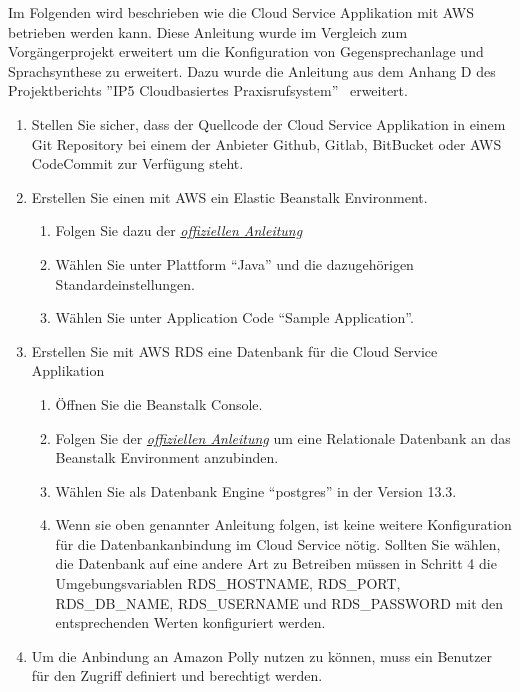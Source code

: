 Im Folgenden wird beschrieben wie die Cloud Service Applikation mit AWS betrieben werden kann.
Diese Anleitung wurde im Vergleich zum Vorgängerprojekt erweitert um die Konfiguration von Gegensprechanlage und Sprachsynthese zu erweitert.
Dazu wurde die Anleitung aus dem Anhang D des Projektberichts ''IP5 Cloudbasiertes Praxisrufsystem''~\cite{ip5} erweitert.

\begin{enumerate}
    \item Stellen Sie sicher, dass der Quellcode der Cloud Service Applikation in einem Git Repository bei einem der Anbieter Github, Gitlab, BitBucket oder AWS CodeCommit zur Verfügung steht.
    \item Erstellen Sie einen mit AWS ein Elastic Beanstalk Environment.
    \begin{enumerate}
        \item Folgen Sie dazu der \href{https://docs.aws.amazon.com/elasticbeanstalk/latest/dg/GettingStarted.CreateApp.html}{\textit{offiziellen Anleitung}}\cite{aws-elastic}
        \item Wählen Sie unter Plattform ``Java'' und die dazugehörigen Standardeinstellungen.
        \item Wählen Sie unter Application Code ``Sample Application''.
    \end{enumerate}
    \item Erstellen Sie mit AWS RDS eine Datenbank für die Cloud Service Applikation
    \begin{enumerate}
        \item Öffnen Sie die Beanstalk Console.
        \item Folgen Sie der \href{https://docs.aws.amazon.com/elasticbeanstalk/latest/dg/using-features.managing.db.html}{\textit{offiziellen Anleitung}}\cite{aws-elastic-rds} um eine Relationale Datenbank an das Beanstalk Environment anzubinden.
        \item Wählen Sie als Datenbank Engine ``postgres'' in der Version 13.3.
        \item Wenn sie oben genannter Anleitung folgen, ist keine weitere Konfiguration für die Datenbankanbindung im Cloud Service nötig.
        Sollten Sie wählen, die Datenbank auf eine andere Art zu Betreiben müssen in Schritt 4 die Umgebungsvariablen RDS\_HOSTNAME, RDS\_PORT, RDS\_DB\_NAME, RDS\_USERNAME und RDS\_PASSWORD mit den entsprechenden Werten konfiguriert werden.
    \end{enumerate}
    \item Um die Anbindung an Amazon Polly nutzen zu können, muss ein Benutzer für den Zugriff definiert und berechtigt werden.

\end{enumerate}
